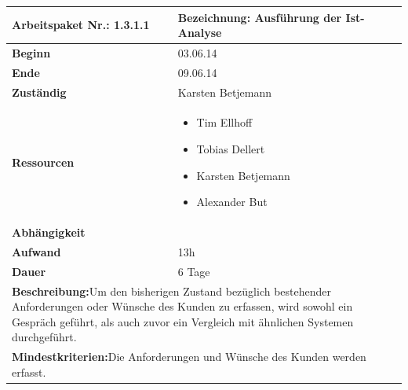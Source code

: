 \documentclass[fontsize=12pt,paper=a4,twoside]{scrartcl}
\begin{document}
\begin{tabular}{|p{5.3cm}|p{9.7cm}|}\hline
	\textbf{Arbeitspaket Nr.:} 1.3.1.1 & \textbf{Bezeichnung:} Ausführung der Ist-Analyse\\  \hline \hline
	\textbf{Beginn} & 03.06.14\\ \hline
	\textbf{Ende} & 09.06.14\\ \hline
	\textbf{Zuständig} & Karsten Betjemann\\ \hline
	\textbf{Ressourcen} & \begin{itemize}
		\item Tim Ellhoff
		\item Tobias Dellert
		\item Karsten Betjemann
		\item Alexander But
	\end{itemize}    \\ \hline
	\textbf{Abhängigkeit} & \\ \hline
	\textbf{Aufwand} & 13h\\ \hline
	\textbf{Dauer} & 6 Tage\\ \hline
	\multicolumn{2}{|p{15cm}|}{\textbf{Beschreibung:}\newline Um den bisherigen Zustand bezüglich bestehender Anforderungen oder Wünsche des Kunden zu erfassen, wird sowohl ein Gespräch geführt, als auch zuvor ein Vergleich mit ähnlichen Systemen durchgeführt.   }\\ \hline
	\multicolumn{2}{|p{15cm}|}{\textbf{Mindestkriterien:}\newline Die Anforderungen und Wünsche des Kunden werden erfasst.}\\ \hline
\end{tabular}

\begin{verbatim} 
\end{verbatim}
\end{document}
